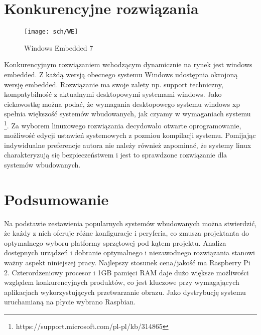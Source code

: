 \section{Konkurencyjne rozwiązania}

\begin{figure}[bth]
\centering
{\texttt{[image: sch/WE]}}
\caption[Windows Embedded 7]{Windows Embedded 7}
\label{fig:sch1}
\end{figure}

Konkurencyjnym rozwiązaniem wchodzącym dynamicznie na rynek jest windows embedded.  Z każdą wersją obecnego systemu Windows udostępnia okrojoną wersję embedded. Rozwiązanie ma swoje zalety np. support techniczny, kompatybilność z aktualnymi desktopowymi systemami windows. Jako ciekawostkę można podać, że wymagania desktopowego systemu windows xp spełnia większość systemów wbudowanych, jak czyamy w wymaganiach systemu \footnote{https://support.microsoft.com/pl-pl/kb/314865}. Za wyborem linuxowego rozwiązania decydowało otwarte oprogramowanie, możliwość edycji ustawień systemowych z pozmiou kompilacji systemu. Pomijając indywidualne preferencje autora nie należy również zapominać, że systemy linux charakteryzują się bezpieczeństwem i jest to sprawdzone rozwiązanie dla systemów wbudowanych.

\section{Podsumowanie}
Na podstawie zestawienia popularnych systemów wbudowanych można stwierdzić, że każdy z nich oferuje różne konfiguracje i peryferia, co zmusza projektanta do optymalnego wyboru platformy sprzętowej pod kątem projektu. Analiza dostępnych urządzeń i dobranie optymalnego i niezawodnego rozwiązania stanowi ważny aspekt niniejszej pracy.
Najlepszy stosunek cena/jakość ma  Raspberry Pi 2. Czterordzeniowy procesor i 1GB pamięci RAM daje dużo większe możliwości względem konkurencyjnych produktów, co jest kluczowe przy  wymagających aplikacjach wykorzystujących przetwarzanie obrazu.
Jako dystrybucję systemu uruchamianą na płycie wybrano Raspbian.


